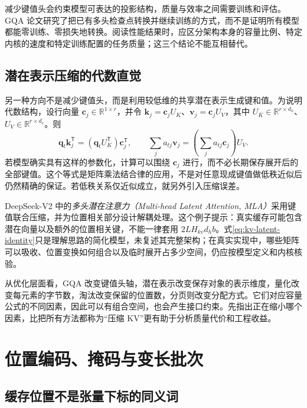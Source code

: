\documentclass[UTF8,12pt,a4paper,fontset=fandol]{ctexart}
\begin{document}
减少键值头会约束模型可表达的投影结构，质量与效率之间需要训练和评估。GQA 论文研究了把已有多头检查点转换并继续训练的方式，而不是证明所有模型都能零训练、零损失地转换\cite{gqa}。阅读性能结果时，应区分架构本身的容量比例、特定内核的速度和特定训练配置的任务质量；这三个结论不能互相替代。

\subsection{潜在表示压缩的代数直觉}

另一种方向不是减少键值头，而是利用较低维的共享潜在表示生成键和值。为说明代数结构，设行向量 $\mathbf c_j\in\mathbb R^{1\times r}$，并令 $\mathbf k_j=\mathbf c_jU_K$、$\mathbf v_j=\mathbf c_jU_V$，其中 $U_K\in\mathbb R^{r\times d_k}$、$U_V\in\mathbb R^{r\times d_v}$。则
\begin{equation}
 \mathbf q_t\mathbf k_j^{\mathsf T}
 =(\mathbf q_tU_K^{\mathsf T})\mathbf c_j^{\mathsf T},
 \qquad
 \sum_j a_{tj}\mathbf v_j
 =\left(\sum_j a_{tj}\mathbf c_j\right)U_V.
 \label{eq:kv-latent-identity}
\end{equation}
若模型确实具有这样的参数化，计算可以围绕 $\mathbf c_j$ 进行，而不必长期保存展开后的全部键值。这个等式是矩阵乘法结合律的应用，不是对任意现成键值做低秩近似后仍然精确的保证。若低秩关系仅近似成立，就另外引入压缩误差。

DeepSeek-V2 中的\emph{多头潜在注意力（Multi-head Latent Attention, MLA）}采用键值联合压缩，并为位置相关部分设计解耦处理\cite{mla}。这个例子提示：真实缓存可能包含潜在向量以及额外的位置相关键，不能一律套用 $2LH_{kv}d_hb$。式\eqref{eq:kv-latent-identity}只是理解思路的简化模型，未复述其完整架构；在真实实现中，哪些矩阵可以吸收、位置变换如何组合以及临时展开占多少空间，仍应按模型定义和内核核验。

从优化层面看，GQA 改变键值头轴，潜在表示改变保存对象的表示维度，量化改变每元素的字节数，淘汰改变保留的位置数，分页则改变分配方式。它们对应容量公式的不同因素，因此可以有组合空间，也会产生接口约束。先指出正在缩小哪个因素，比把所有方法都称为“压缩 KV”更有助于分析质量代价和工程收益。

\section{位置编码、掩码与变长批次}
\label{sec:kv-position-mask}

\subsection{缓存位置不是张量下标的同义词}
\end{document}
